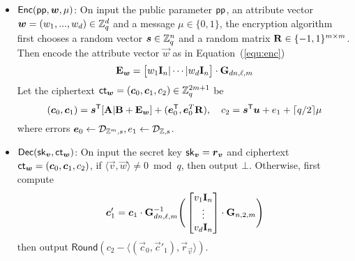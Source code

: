 \begin{itemize}[leftmargin=*]
 \item $\mathsf{Enc}(\mathsf{pp}, \boldsymbol{w}, \mu)$: On input the public parameter $\mathsf{pp}$, an attribute vector $\boldsymbol{w} = (w_1,..., w_d) \in \mathbb{Z}_q^d$ and a message $\mu \in \{0,1\}$, the encryption algorithm first chooses a random vector $\boldsymbol{s} \in \mathbb{Z}_q^n$ and a random matrix $\mathbf{R} \in \{-1, 1\}^{m \times m}$. Then encode the attribute vector $\vec{w}$ as in Equation~(\ref{equ:enc})
 $$\mathbf{E}_{\boldsymbol{w}} = \big[w_1 \mathbf{I}_n | \cdots | w_d \mathbf{I}_n \big] \cdot
\mathbf{G}_{dn, \ell, m}$$
Let the ciphertext $\mathsf{ct}_{\boldsymbol{w}} = (\boldsymbol{c}_0, \boldsymbol{c}_1, c_2) \in \mathbb{Z}_q^{2m + 1}$ be
$$(\boldsymbol{c}_0, \boldsymbol{c}_1) = \boldsymbol{s}^{\mathsf{T}} [\mathbf{A} | \mathbf{B} + \mathbf{E}_{\boldsymbol{w}}] + (\boldsymbol{e}^{\mathsf{T}}_0, \boldsymbol{e}_0^T \mathbf{R}), \quad c_2 = \boldsymbol{s}^{\mathsf{T}} \boldsymbol{u} + e_1 + \lceil q / 2 \rceil \mu$$
where errors $\boldsymbol{e}_0 \leftarrow \mathcal{D}_{\mathbb{Z}^m, s}, e_1 \leftarrow \mathcal{D}_{\mathbb{Z}, s}$.

\item $\mathsf{Dec}(\mathsf{sk}_{\boldsymbol{v}}, \mathsf{ct}_{\boldsymbol{w}})$: On input the secret key $\mathsf{sk}_{\boldsymbol{v}} = \boldsymbol{r}_{\boldsymbol{v}}$ and ciphertext $\mathsf{ct}_{\boldsymbol{w}} = (\boldsymbol{c}_0, \boldsymbol{c}_1, c_2)$, if $\langle \vec{v}, \vec{w} \rangle \neq 0 \bmod q$, then output $\bot$. Otherwise, first compute
$$\boldsymbol{c}'_1 = \boldsymbol{c}_1 \cdot \mathbf{G}_{dn, \ell, m}^{-1}
 \Bigg(\begin{bmatrix}
v_{1}\mathbf{I}_n \\
\vdots \\
v_{d}\mathbf{I}_n
\end{bmatrix} \cdot \mathbf{G}_{n, 2, m}\Bigg)$$
then output $\mathsf{Round}(c_2 - \langle (\vec{c}_0, \vec{c}'_1), \vec{r}_{\vec{v}} \rangle)$.
\end{itemize}


